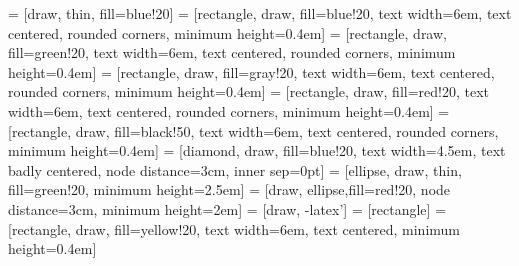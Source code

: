  = [draw, thin, fill=blue!20]
 = [rectangle, draw, fill=blue!20, text width=6em, text centered, rounded corners, minimum height=0.4em]
 = [rectangle, draw, fill=green!20, text width=6em, text centered, rounded corners, minimum height=0.4em]
 = [rectangle, draw, fill=gray!20, text width=6em, text centered, rounded corners, minimum height=0.4em]
 = [rectangle, draw, fill=red!20, text width=6em, text centered, rounded corners, minimum height=0.4em]
 = [rectangle, draw, fill=black!50, text width=6em, text centered, rounded corners, minimum height=0.4em]
 = [diamond, draw, fill=blue!20, text width=4.5em, text badly centered, node distance=3cm, inner sep=0pt]
 = [ellipse, draw, thin, fill=green!20, minimum height=2.5em]
 = [draw, ellipse,fill=red!20, node distance=3cm, minimum height=2em]
 = [draw, -latex']
 = [rectangle]
 = [rectangle, draw, fill=yellow!20, text width=6em, text centered, minimum height=0.4em]


